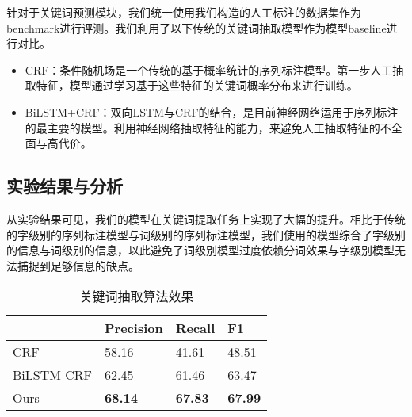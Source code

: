 针对于关键词预测模块，我们统一使用我们构造的人工标注的数据集作为benchmark进行评测。我们利用了以下传统的关键词抽取模型作为模型baseline进行对比。


\begin{itemize}
	\item CRF：条件随机场是一个传统的基于概率统计的序列标注模型。第一步人工抽取特征，模型通过学习基于这些特征的关键词概率分布来进行训练。
	\item BiLSTM+CRF：双向LSTM与CRF的结合，是目前神经网络运用于序列标注的最主要的模型。利用神经网络抽取特征的能力，来避免人工抽取特征的不全面与高代价。
\end{itemize}

\subsection{实验结果与分析}

从实验结果可见，我们的模型在关键词提取任务上实现了大幅的提升。相比于传统的字级别的序列标注模型与词级别的序列标注模型，我们使用的模型综合了字级别的信息与词级别的信息，以此避免了词级别模型过度依赖分词效果与字级别模型无法捕捉到足够信息的缺点。

\begin{table}[]
\center
\begin{tabular}{llll}
\hline
       & Precision  & Recall & F1    \\ \hline
CRF        & 58.16  & 41.61 & 48.51 \\
BiLSTM-CRF & 62.45  & 61.46 & 63.47 \\ \hline
Ours       & \textbf{68.14}  & \textbf{67.83} & \textbf{67.99} \\ \hline
\end{tabular}
\caption{关键词抽取算法效果}
\end{table}

